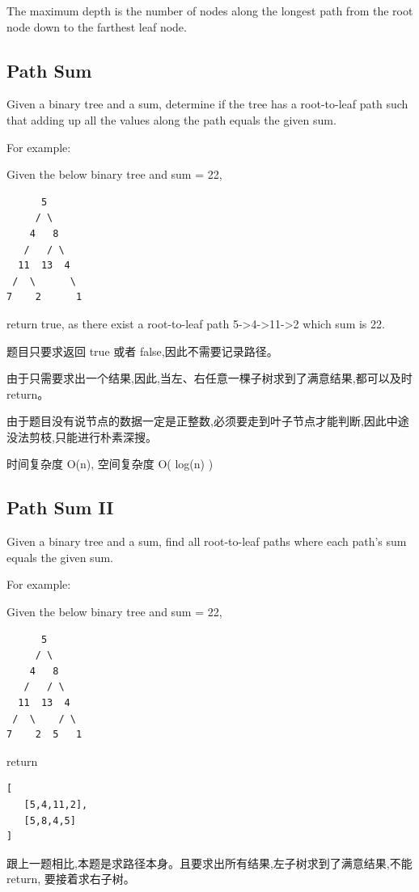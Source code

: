 \documentclass[12pt]{book}
\begin{document}
The maximum depth is the number of nodes along the longest path from the root node down to the farthest leaf node.

\subsection{Path Sum}
\label{sec-4-4-3}
Given a binary tree and a sum, determine if the tree has a root-to-leaf path such that adding up all the values along the path equals the given sum.

For example:

Given the below binary tree and sum = 22,
\lstset{language=java,label= ,caption= ,numbers=none}
\begin{lstlisting}
      5
     / \
    4   8
   /   / \
  11  13  4
 /  \      \
7    2      1
\end{lstlisting}

return true, as there exist a root-to-leaf path 5->4->11->2 which sum is 22.

题目只要求返回 true 或者 false,因此不需要记录路径。

由于只需要求出一个结果,因此,当左、右任意一棵子树求到了满意结果,都可以及时 return。

由于题目没有说节点的数据一定是正整数,必须要走到叶子节点才能判断,因此中途没法剪枝,只能进行朴素深搜。

时间复杂度 O(n), 空间复杂度 O( log(n) )

\subsection{Path Sum II}
\label{sec-4-4-4}
Given a binary tree and a sum, find all root-to-leaf paths where each path's sum equals the given sum.

For example:

Given the below binary tree and sum = 22,
\lstset{language=java,label= ,caption= ,numbers=none}
\begin{lstlisting}
      5
     / \
    4   8
   /   / \
  11  13  4
 /  \    / \
7    2  5   1
\end{lstlisting}

return
\lstset{language=java,label= ,caption= ,numbers=none}
\begin{lstlisting}
[
   [5,4,11,2],
   [5,8,4,5]
]
\end{lstlisting}

跟上一题相比,本题是求路径本身。且要求出所有结果,左子树求到了满意结果,不能 return, 要接着求右子树。
\end{document}
